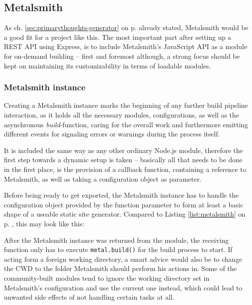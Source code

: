 \subsection{Metalsmith}
\label{sec:foundation-metalsmith}

As ch. \ref{sec:primarythoughts-generator} on p. \pageref{sec:primarythoughts-generator} already stated, Metalsmith would be a good fit for a project like this. The most important part after setting up a REST API using Express, is to include Metalsmith's JavaScript API as a module for on-demand building -- first and foremost although, a strong focus should be kept on maintaining its customizability in terms of loadable modules.

\subsubsection{Metalsmith instance}
Creating a Metalsmith instance marks the beginning of any further build pipeline interaction, as it holds all the necessary modules, configurations, as well as the asynchronous \emph{build}-function, caring for the overall work and furthermore emitting different events for signaling errors or warnings during the process itself.

It is included the same way as any other ordinary Node.js module, therefore the first step towards a dynamic setup is taken -- basically all that needs to be done in the first place, is the provision of a callback function, containing a reference to Metalsmith, as well as taking a configuration object as parameter.

Before being ready to get exported, the Metalsmith instance has to handle the configuration object provided by the function parameter to form at least a basic shape of a useable static site generator. Compared to Listing \ref{list:metalsmith} on p. \pageref{list:metalsmith}, this may look like this:



After the Metalsmith instance was returned from the module, the receiving function only has to execute \texttt{metal.build()} for the build process to start. If acting form a foreign working directory, a smart advice would also be to change the CWD to the folder Metalsmith should perform his actions in. Some of the community-built modules tend to ignore the working directory set in Metalsmith's configuration and use the current one instead, which could lead to unwanted side effects of not handling certain tasks at all.

